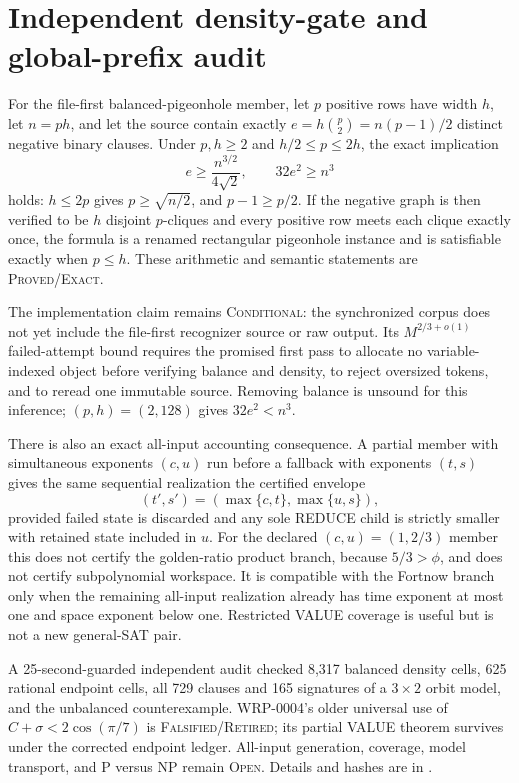 \section{Independent density-gate and global-prefix audit}
For the file-first balanced-pigeonhole member, let $p$ positive rows have
width $h$, let $n=ph$, and let the source contain exactly
$e=h\binom p2=n(p-1)/2$ distinct negative binary clauses.  Under
$p,h\ge2$ and $h/2\le p\le2h$, the exact implication
\[
 e\ge\frac{n^{3/2}}{4\sqrt2},\qquad 32e^2\ge n^3
\]
holds: $h\le2p$ gives $p\ge\sqrt{n/2}$, and $p-1\ge p/2$.
If the negative graph is then verified to be $h$ disjoint $p$-cliques and
every positive row meets each clique exactly once, the formula is a renamed
rectangular pigeonhole instance and is satisfiable exactly when $p\le h$.
These arithmetic and semantic statements are \textsc{Proved/Exact}.

The implementation claim remains \textsc{Conditional}: the synchronized
corpus does not yet include the file-first recognizer source or raw output.
Its $M^{2/3+o(1)}$ failed-attempt bound requires the promised first pass to
allocate no variable-indexed object before verifying balance and density,
to reject oversized tokens, and to reread one immutable source.  Removing
balance is unsound for this inference; $(p,h)=(2,128)$ gives $32e^2<n^3$.

There is also an exact all-input accounting consequence.  A partial member
with simultaneous exponents $(c,u)$ run before a fallback with exponents
$(t,s)$ gives the same sequential realization the certified envelope
\[
 (t',s')=(\max\{c,t\},\max\{u,s\}),
\]
provided failed state is discarded and any sole REDUCE child is strictly
smaller with retained state included in $u$.  For the declared
$(c,u)=(1,2/3)$ member this does not certify the golden-ratio product branch,
because $5/3>\phi$, and does not certify subpolynomial workspace.  It is
compatible with the Fortnow branch only when the remaining all-input
realization already has time exponent at most one and space exponent below
one.  Restricted VALUE coverage is useful but is not a new general-SAT pair.

A 25-second-guarded independent audit checked 8,317 balanced density cells,
625 rational endpoint cells, all 729 clauses and 165 signatures of a
$3\times2$ orbit model, and the unbalanced counterexample.  WRP-0004's older
universal use of $C+\sigma<2\cos(\pi/7)$ is
\textsc{Falsified/Retired}; its partial VALUE theorem survives under the
corrected endpoint ledger.  All-input generation, coverage, model transport,
and P versus NP remain \textsc{Open}.  Details and hashes are in
.
